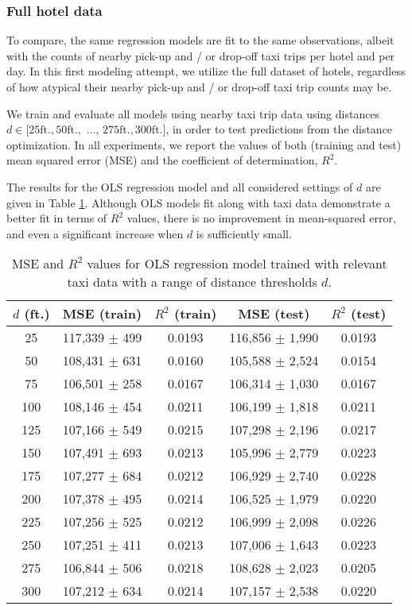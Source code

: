 \documentclass[useAMS, usenatbib]{biom}
\begin{document}
\subsubsection{Full hotel data}

To compare, the same regression models are fit to the same observations, albeit with the counts of nearby pick-up and / or drop-off taxi trips per hotel and per day. In this first modeling attempt, we utilize the full dataset of hotels, regardless of how atypical their nearby pick-up and / or drop-off taxi trip counts may be.

We train and evaluate all models using nearby taxi trip data using distances $d \in [25 \mathrm{ft.}, 50 \mathrm{ft.},$ ..., $275 \mathrm{ft.}, 300 \mathrm{ft.}]$, in order to test predictions from the distance optimization. In all experiments, we report the values of both (training and test) mean squared error (MSE) and the coefficient of determination, $R^2$.

The results for the OLS regression model and all considered settings of $d$ are given in Table \ref{t:lr_taxi_performance}. Although OLS models fit along with taxi data demonstrate a better fit in terms of $R^2$ values, there is no improvement in mean-squared error, and even a significant increase when $d$ is sufficiently small.

\begin{table}
\caption{MSE and $R^2$ values for OLS regression model trained with relevant taxi data with a range of distance thresholds $d$.}
\label{t:lr_taxi_performance}
\begin{center}
\resizebox{\columnwidth}{!}
{
 \begin{tabular}{||c|c|c|c|c||}
 \hline
 $d$ (ft.) & MSE (train) & $R^2$ (train) & MSE (test) & $R^2$ (test) \\
 \hline
 25 & 117,339 $\pm$ 499 & 0.0193 & 116,856 $\pm$ 1,990 & 0.0193 \\
 50 & 108,431 $\pm$ 631 & 0.0160 & 105,588 $\pm$ 2,524 & 0.0154 \\
 75 & 106,501 $\pm$ 258 & 0.0167 & 106,314 $\pm$ 1,030 & 0.0167 \\
 100 & 108,146 $\pm$ 454 & 0.0211 & 106,199 $\pm$ 1,818 & 0.0211 \\
 125 & 107,166 $\pm$ 549 & 0.0215 & 107,298 $\pm$ 2,196 & 0.0217 \\
 150 & 107,491 $\pm$ 693 & 0.0213 & 105,996 $\pm$ 2,779 & 0.0223 \\
 175 & 107,277 $\pm$ 684 & 0.0212 & 106,929 $\pm$ 2,740 & 0.0228 \\
 200 & 107,378 $\pm$ 495 & 0.0214 & 106,525 $\pm$ 1,979 & 0.0220 \\
 225 & 107,256 $\pm$ 525 & 0.0212 & 106,999 $\pm$ 2,098 & 0.0226 \\
 250 & 107,251 $\pm$ 411 & 0.0213 & 107,006 $\pm$ 1,643 & 0.0223 \\
 275 & 106,844 $\pm$ 506 & 0.0218 & 108,628 $\pm$ 2,023 & 0.0205 \\
 300 & 107,212 $\pm$ 634 & 0.0214 & 107,157 $\pm$ 2,538 & 0.0220 \\
 \hline
\end{tabular}
}
\end{center}
\end{table}
\end{document}
